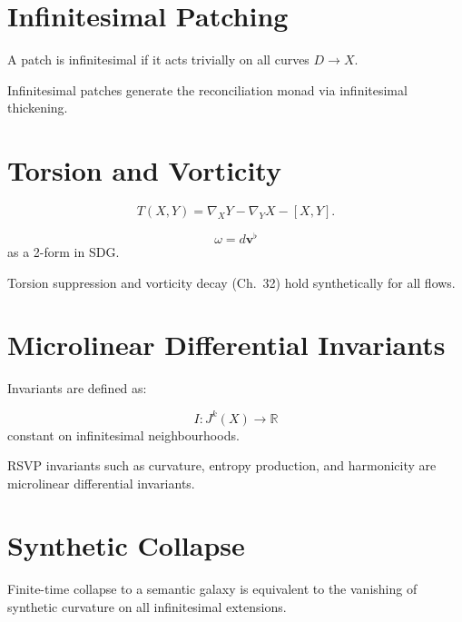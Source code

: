 \section{Infinitesimal Patching}

\begin{definition}
A patch is infinitesimal if it acts trivially on all curves $D\to X$.
\end{definition}

\begin{proposition}
Infinitesimal patches generate the reconciliation monad via infinitesimal thickening.
\end{proposition}

\section{Torsion and Vorticity}

\begin{definition}
\[
T(X,Y) = \nabla_X Y - \nabla_Y X - [X,Y].
\]
\end{definition}

\begin{definition}
\[
\omega = d\mathbf{v}^\flat
\]
as a 2-form in SDG.
\end{definition}

\begin{proposition}
Torsion suppression and vorticity decay (Ch.\ 32) hold synthetically for all flows.
\end{proposition}

\section{Microlinear Differential Invariants}

Invariants are defined as:

\[
I : J^k(X) \to \mathbb{R}
\]
constant on infinitesimal neighbourhoods.

\begin{proposition}
RSVP invariants such as curvature, entropy production, and harmonicity are microlinear differential invariants.
\end{proposition}

\section{Synthetic Collapse}

\begin{proposition}
Finite-time collapse to a semantic galaxy is equivalent to the vanishing of synthetic curvature on all infinitesimal extensions.
\end{proposition}

